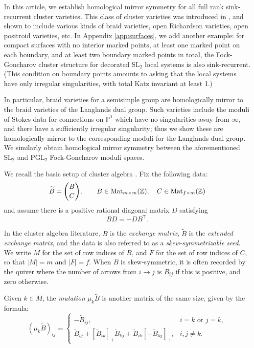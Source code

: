 \documentclass[12pt, letter]{amsart}
\theoremstyle{definition}
\begin{document}
In this article, we establish homological mirror symmetry for all full rank sink-recurrent cluster varieties.  This class of cluster varieties was introduced in \cite{GLSS}, and shown to include various kinds of braid varieties, open Richardson varieties, open positroid varieties, etc.  In Appendix \ref{app:surfaces}, we add another example: for compact surfaces with no interior marked points, at least one marked point on each boundary, and at least two boundary marked points in total,  the Fock-Goncharov \cite{FG06} cluster structure for decorated $\mathrm{SL}_2$ local systems is also sink-recurrent.  (This condition on boundary points amounts to asking that the local systems have only irregular singularities, with total Katz invariant at least 1.) 

In particular, braid varieties for a semisimple group are homologically mirror to the braid varieties of the Langlands dual group.  Such varieties include the moduli of Stokes data for connections on $\mathbb{P}^1$ which have no singularities away from $\infty$, and there have a sufficiently irregular singularity; thus we show these are homologically mirror to the corresponding moduli for the Langlands dual group.  
We similarly obtain homological mirror symmetry between the aforementioned $\mathrm{SL}_2$ and $\mathrm{PGL}_2$ Fock-Goncharov moduli spaces.


We recall the basic setup of cluster algebra \cite{FZ-I}. 
Fix the following data: 
\[
 \widetilde B=\binom BC,\qquad B\in\operatorname{Mat}_{m\times m}(\mathbb{Z}),
 \quad C\in\operatorname{Mat}_{f\times m}(\mathbb{Z})
\]
and assume there is a positive rational diagonal matrix $D$
satisfying
\begin{equation}\label{eq:symmetrizer}
 BD=-DB^{\mathsf T}.
\end{equation}


In the cluster algebra literature, $B$ is the {\em exchange matrix}, $\widetilde B$ is the {\em extended exchange matrix}, and the data is also referred to as a {\em skew-symmetrizable seed}. We write $M$ for the set of row indices of $B$, and $F$ for the set of row indices of $C$, so that $|M|=m$ and $|F|=f$.  
When \(B\) is skew-symmetric, it is often recorded by the quiver  where the number of 
arrows from $i\to j$ is $B_{ij}$ if this is positive, and zero otherwise. 



Given $k \in M$, the {\em mutation} $\mu_k \widetilde B$ is another matrix of the same size, given by the formula: 
\[
 (\mu_k\widetilde B)_{ij}=\begin{cases}
 -\widetilde B_{ij},&i=k\text{ or }j=k,\\
 \widetilde B_{ij}+[\widetilde B_{ik}]_+\widetilde B_{kj}+\widetilde B_{ik}[-\widetilde B_{kj}]_+,&i,j\ne k.
 \end{cases}
\]
\end{document}
